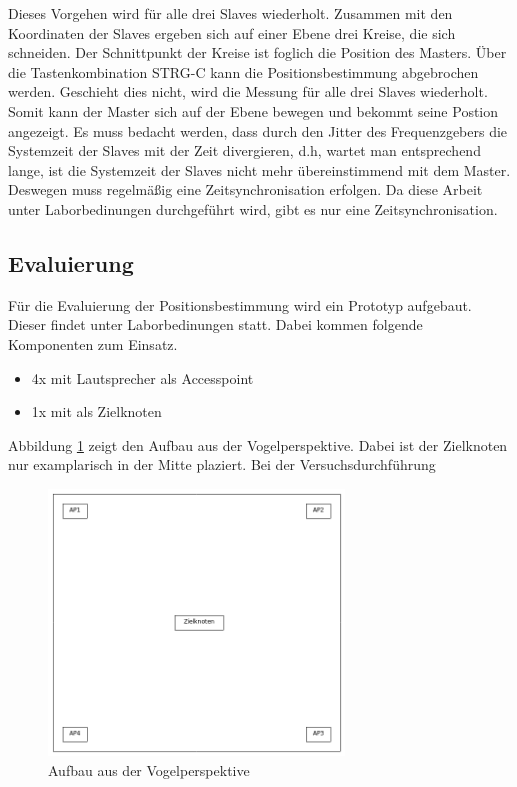 Dieses Vorgehen wird für alle drei Slaves wiederholt. Zusammen mit den Koordinaten der Slaves ergeben sich auf einer Ebene drei Kreise, die sich schneiden. Der Schnittpunkt der Kreise ist foglich die Position des Masters. Über die Tastenkombination STRG-C kann die Positionsbestimmung abgebrochen werden. Geschieht dies nicht, wird die Messung für alle drei Slaves wiederholt. Somit kann der Master sich auf der Ebene bewegen und bekommt seine Postion angezeigt. Es muss bedacht werden, dass durch den Jitter des Frequenzgebers die Systemzeit der Slaves mit der Zeit divergieren, d.h, wartet man entsprechend lange, ist die Systemzeit der Slaves nicht mehr übereinstimmend mit dem Master. Deswegen muss regelmäßig eine Zeitsynchronisation erfolgen. Da diese Arbeit unter Laborbedinungen durchgeführt wird, gibt es nur eine Zeitsynchronisation.

\subsection{Evaluierung}
Für die Evaluierung der Positionsbestimmung wird ein Prototyp aufgebaut. Dieser findet unter Laborbedinungen statt. Dabei kommen folgende Komponenten zum Einsatz.

\begin{itemize}
\item 4x \board \platz mit Lautsprecher als Accesspoint
\item 1x \board \platz mit \microphone \platz als Zielknoten
\end{itemize}

Abbildung \ref{img:prototyp} zeigt den Aufbau aus der Vogelperspektive. Dabei ist der Zielknoten nur examplarisch in der Mitte plaziert. Bei der Versuchsdurchführung

\begin{figure}[H]
        \centering
        \includegraphics[width=0.7\textwidth]{images/prototyp.png}
        \caption{Aufbau aus der Vogelperspektive}
        \label{img:prototyp}
\end{figure}

